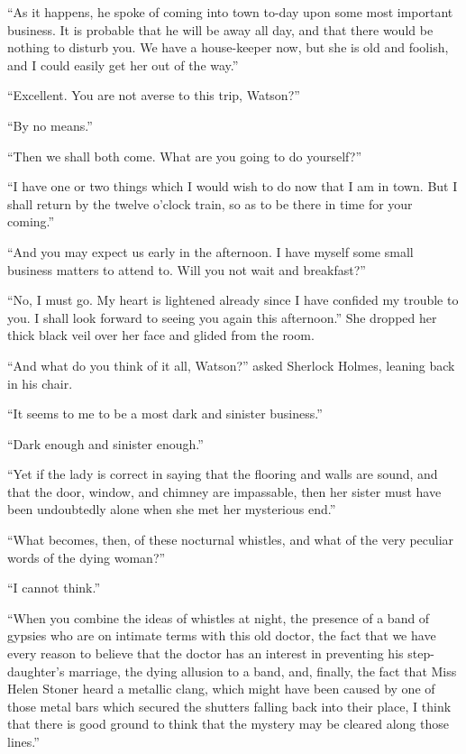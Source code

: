 “As it happens, he spoke of coming into town to-day upon
some most important business. It is probable that he will be
away all day, and that there would be nothing to disturb you.
We have a house-keeper now, but she is old and foolish, and I
could easily get her out of the way.”

“Excellent. You are not averse to this trip, Watson?”

“By no means.”

“Then we shall both come. What are you going to do
yourself?”

“I have one or two things which I would wish to do now
that I am in town. But I shall return by the twelve o’clock
train, so as to be there in time for your coming.”

“And you may expect us early in the afternoon. I have
myself some small business matters to attend to. Will you
not wait and breakfast?”

“No, I must go. My heart is lightened already since I
have confided my trouble to you. I shall look forward to seeing
you again this afternoon.” She dropped her thick black
veil over her face and glided from the room.

“And what do you think of it all, Watson?” asked Sherlock
Holmes, leaning back in his chair.

“It seems to me to be a most dark and sinister
business.”

“Dark enough and sinister enough.”

“Yet if the lady is correct in saying that the flooring and
walls are sound, and that the door, window, and chimney are
impassable, then her sister must have been undoubtedly alone
when she met her mysterious end.”

“What becomes, then, of these nocturnal whistles, and what
of the very peculiar words of the dying woman?”

“I cannot think.”

“When you combine the ideas of whistles at night, the presence
of a band of gypsies who are on intimate terms with this
old doctor, the fact that we have every reason to believe that
the doctor has an interest in preventing his step-daughter’s
marriage, the dying allusion to a band, and, finally, the fact
that Miss Helen Stoner heard a metallic clang, which might
have been caused by one of those metal bars which secured
the shutters falling back into their place, I think that there is
good ground to think that the mystery may be cleared along
those lines.”

